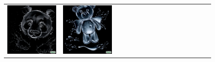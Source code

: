 \begin{figure}[ht!]
\begin{adjustwidth}{-0.8in}{-0.5in}
\begin{tabular}{cccccccccccccccccccc}
\multicolumn{3}{c}{\includegraphics[width=\twobytwocolwidth\textwidth]{figures/cherries/water_panda.jpg}} &
\multicolumn{3}{c}{\includegraphics[width=\twobytwocolwidth\textwidth]{figures/cherries/water_teddy_bear.jpg}} &&

\end{tabular}
\end{adjustwidth}
\end{figure}
